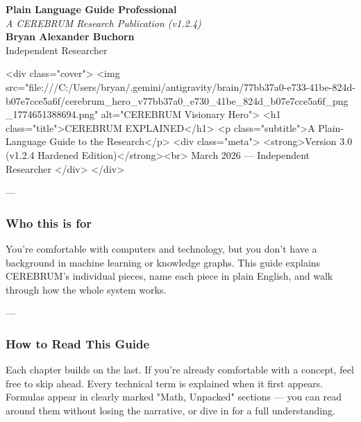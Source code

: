 \documentclass[11pt,article,oneside]{memoir}
\begin{document}
\begin{center}
    \Huge \textbf{Plain Language Guide Professional} \\
    \vspace{0.5em}
    \large \textit{A CEREBRUM Research Publication (v1.2.4)} \\
    \vspace{1em}
    \large \textbf{Bryan Alexander Buchorn} \\
    Independent Researcher \\
    \vspace{2em}
\end{center}

\begin{abstract}
\textbf{Overview:} This guide provides a conceptual entry point into the CEREBRUM framework. It is designed for practitioners and researchers seeking to understand the core reasoning signals of Framework Implementation Guide.
\end{abstract}

\textless div class="cover"\textgreater 
    \textless img src="file:///C:/Users/bryan/.gemini/antigravity/brain/77bb37a0-e733-41be-824d-b07e7cce5a6f/cerebrum\_hero\_v77bb37a0\_e730\_41be\_824d\_b07e7cce5a6f\_png\_1774651388694.png" alt="CEREBRUM Visionary Hero"\textgreater 
    \textless h1 class="title"\textgreater CEREBRUM EXPLAINED\textless /h1\textgreater 
    \textless p class="subtitle"\textgreater A Plain-Language Guide to the Research\textless /p\textgreater 
    \textless div class="meta"\textgreater 
        \textless strong\textgreater Version 3.0 (v1.2.4 Hardened Edition)\textless /strong\textgreater \textless br\textgreater 
        March 2026 — Independent Researcher
    \textless /div\textgreater 
\textless /div\textgreater 

---

\subsubsection{\textbf{Who this is for}}
You're comfortable with computers and technology, but you don't have a background in machine learning or knowledge graphs. This guide explains CEREBRUM's individual pieces, name each piece in plain English, and walk through how the whole system works.

---

\subsubsection{\textbf{How to Read This Guide}}
Each chapter builds on the last. If you're already comfortable with a concept, feel free to skip ahead. Every technical term is explained when it first appears. Formulas appear in clearly marked "Math, Unpacked" sections — you can read around them without losing the narrative, or dive in for a full under\-standing.
\end{document}
